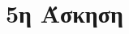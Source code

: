 \documentclass[assignment2.tex]{subfiles}
\begin{document}
\section*{5η Άσκηση}


%
%
%
%
\end{document}
